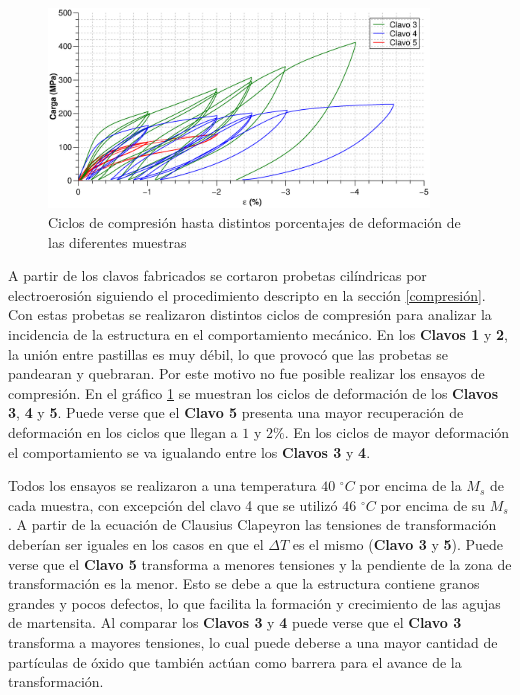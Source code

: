 \documentclass[a4paper,12pt,fleqn,twoside,openany]{book}
\begin{document}
 \begin{figure}[h]
 \centering
 \includegraphics[width=0.9\textwidth]{Img/Resultados/clavos/Clavos_3_4_5.eps}
 \caption{Ciclos de compresión hasta distintos porcentajes de deformación de las diferentes muestras  } 
 \label{fig: Clavos3y4}
 \end{figure}







A partir de los clavos fabricados se cortaron probetas cilíndricas por electroerosión siguiendo el procedimiento descripto en la sección \ref{compresión}. Con estas probetas se realizaron distintos ciclos de compresión para analizar la incidencia de la estructura en el comportamiento mecánico. En los \textbf{Clavos 1} y \textbf{2}, la unión entre pastillas es muy débil, lo que provocó que las probetas se pandearan y quebraran. Por este motivo no fue posible realizar los ensayos de compresión. En el gráfico \ref{fig: Clavos3y4} se muestran los ciclos de deformación de los \textbf{Clavos 3}, \textbf{4} y \textbf{5}. Puede verse que el \textbf{Clavo 5} presenta una mayor recuperación de deformación en los ciclos que llegan a $1$ y $2 \%$. En los ciclos de mayor deformación el comportamiento se va igualando entre los \textbf{Clavos 3} y \textbf{4}.

Todos los ensayos se realizaron a una temperatura $40$ $^\circ C$ por encima de la $M_s$ de cada muestra, con excepción del clavo 4 que se utilizó $46$ $^\circ C$ por encima de su $M_s$. A partir de la ecuación de Clausius Clapeyron las tensiones de transformación deberían ser iguales en los casos en que el $\Delta T$ es el mismo (\textbf{Clavo 3} y \textbf{5}). Puede verse que el \textbf{Clavo 5} transforma a menores tensiones y la pendiente de la zona de transformación es la menor. Esto se debe a que la estructura contiene granos grandes y pocos defectos, lo que facilita la formación y crecimiento de las agujas de martensita. Al comparar los \textbf{Clavos 3} y \textbf{4} puede verse que el \textbf{Clavo 3} transforma a mayores tensiones, lo cual puede deberse a una mayor cantidad de partículas de óxido que también actúan como barrera para el avance de la transformación.  
\end{document}
